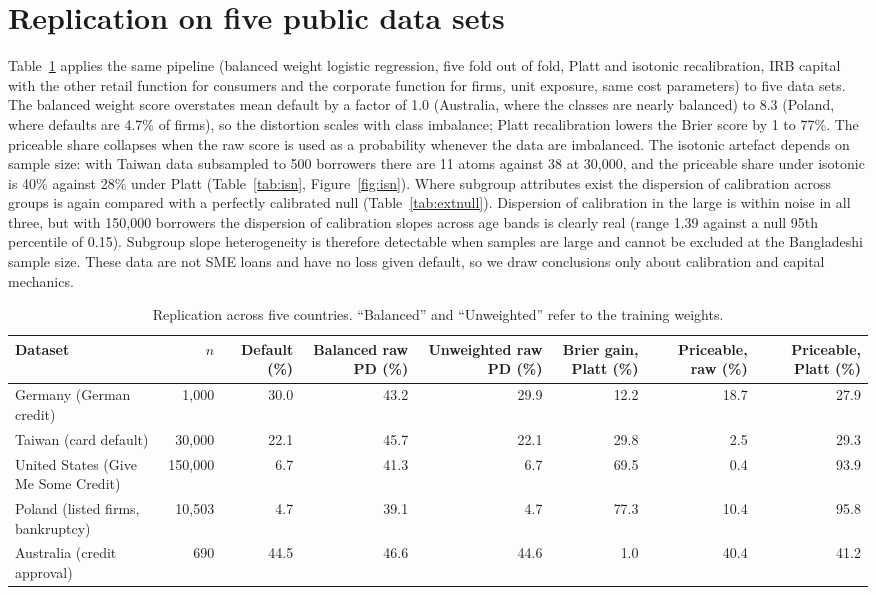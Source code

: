 \documentclass[11pt,a4paper]{article}
\newcommand{\tabsize}{\footnotesize}
\begin{document}
\section{Replication on five public data sets}\label{sec:external}
Table~\ref{tab:ext} applies the same pipeline (balanced weight logistic regression, five fold out of fold, Platt and isotonic recalibration, IRB capital with the other retail function for consumers and the corporate function for firms, unit exposure, same cost parameters) to five data sets. The balanced weight score overstates mean default by a factor of 1.0 (Australia, where the classes are nearly balanced) to 8.3 (Poland, where defaults are 4.7\% of firms), so the distortion scales with class imbalance; Platt recalibration lowers the Brier score by 1 to 77\%. The priceable share collapses when the raw score is used as a probability whenever the data are imbalanced. The isotonic artefact depends on sample size: with Taiwan data subsampled to 500 borrowers there are 11 atoms against 38 at 30{,}000, and the priceable share under isotonic is 40\% against 28\% under Platt (Table~\ref{tab:isn}, Figure~\ref{fig:isn}). Where subgroup attributes exist the dispersion of calibration across groups is again compared with a perfectly calibrated null (Table~\ref{tab:extnull}). Dispersion of calibration in the large is within noise in all three, but with 150{,}000 borrowers the dispersion of calibration slopes across age bands is clearly real (range 1.39 against a null 95th percentile of 0.15). Subgroup slope heterogeneity is therefore detectable when samples are large and cannot be excluded at the Bangladeshi sample size. These data are not SME loans and have no loss given default, so we draw conclusions only about calibration and capital mechanics.
\begin{table}[H]\centering\tabsize\setlength{\tabcolsep}{2.5pt}\caption{Replication across five countries. ``Balanced'' and ``Unweighted'' refer to the training weights.}\label{tab:ext}
\begin{adjustbox}{max width=\textwidth}
\begin{tabular}{lrrrrrrr}
\toprule
Dataset & $n$ & Default (\%) & Balanced raw PD (\%) & Unweighted raw PD (\%) & Brier gain, Platt (\%) & Priceable, raw (\%) & Priceable, Platt (\%) \\
\midrule
Germany (German credit) & 1,000 & 30.0 & 43.2 & 29.9 & 12.2 & 18.7 & 27.9 \\
Taiwan (card default) & 30,000 & 22.1 & 45.7 & 22.1 & 29.8 & 2.5 & 29.3 \\
United States (Give Me Some Credit) & 150,000 & 6.7 & 41.3 & 6.7 & 69.5 & 0.4 & 93.9 \\
Poland (listed firms, bankruptcy) & 10,503 & 4.7 & 39.1 & 4.7 & 77.3 & 10.4 & 95.8 \\
Australia (credit approval) & 690 & 44.5 & 46.6 & 44.6 & 1.0 & 40.4 & 41.2 \\
\bottomrule
\end{tabular}
\end{adjustbox}\end{table}
\end{document}
